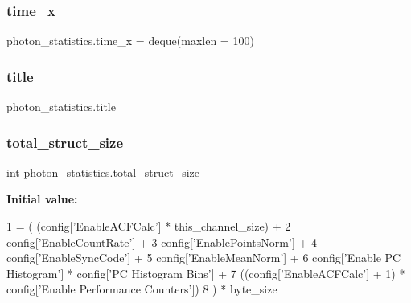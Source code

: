 \mbox{\label{namespacephoton__statistics_a718548ec119098f106f9ff9f31b409bf}} 
\subsubsection{\texorpdfstring{time\+\_\+x}{time\_x}}
{\footnotesize\ttfamily photon\+\_\+statistics.\+time\+\_\+x = deque(maxlen = 100)}

\mbox{\label{namespacephoton__statistics_a76d9f47b30df749d7d370e77849ca649}} 
\subsubsection{\texorpdfstring{title}{title}}
{\footnotesize\ttfamily photon\+\_\+statistics.\+title}

\mbox{\label{namespacephoton__statistics_aa8b4fc62029e126fa660593daaa282f8}} 
\subsubsection{\texorpdfstring{total\+\_\+struct\+\_\+size}{total\_struct\_size}}
{\footnotesize\ttfamily int photon\+\_\+statistics.\+total\+\_\+struct\+\_\+size}

{\bfseries Initial value\+:}
\begin{DoxyCode}
1 =  (    (config[\textcolor{stringliteral}{'EnableACFCalc'}] * this\_channel\_size) + 
2                             config[\textcolor{stringliteral}{'EnableCountRate'}] +
3                             config[\textcolor{stringliteral}{'EnablePointsNorm'}] +
4                             config[\textcolor{stringliteral}{'EnableSyncCode'}] +
5                             config[\textcolor{stringliteral}{'EnableMeanNorm'}] + 
6                             config[\textcolor{stringliteral}{'Enable PC Histogram'}] * config[\textcolor{stringliteral}{'PC Histogram Bins'}] +
7                             ((config[\textcolor{stringliteral}{'EnableACFCalc'}] + 1) * config[\textcolor{stringliteral}{'Enable Performance Counters'}])
8                         ) * byte\_size
\end{DoxyCode}
\mbox{\label{namespacephoton__statistics_aa0ea01ea8f5c4844ed6c10dbe51d0497}} 
